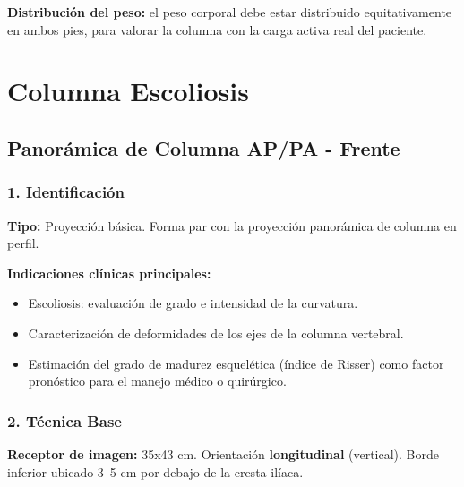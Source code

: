 	\textbf{Distribución del peso:} el peso corporal debe estar distribuido equitativamente en ambos pies, para valorar la columna con la carga activa real del paciente.
	
	
	
	\clearpage
	
	
	\section{Columna Escoliosis}
	
	\subsection{Panorámica de Columna AP/PA - Frente}
	
	\subsubsection*{1. Identificación}
	
	\textbf{Tipo:} Proyección básica. Forma par con la proyección panorámica de columna en perfil.
	
	\textbf{Indicaciones clínicas principales:}
	\begin{itemize}
		\item Escoliosis: evaluación de grado e intensidad de la curvatura.
		\item Caracterización de deformidades de los ejes de la columna vertebral.
		\item Estimación del grado de madurez esquelética (índice de Risser) como factor pronóstico para el manejo médico o quirúrgico.
	\end{itemize}
	
	\subsubsection*{2. Técnica Base}
	
	\textbf{Receptor de imagen:} 35x43 cm. Orientación \textbf{longitudinal} (vertical). Borde inferior ubicado 3--5 cm por debajo de la cresta ilíaca.
	
